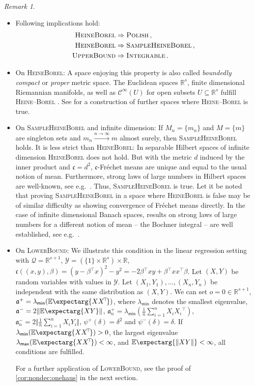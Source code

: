 \documentclass{scrartcl}
\renewcommand{\subset}{\subseteq}
\newcommand{\Ex}{\E\expectarg}
\newcommand*{\mc}[1]{\mathcal{#1}}
\newcommand*{\ms}[1]{\mathsf{#1}}
\newcommand*{\mf}[1]{\mathfrak{#1}}
\newcommand{\R}{\mathbb{R}}
\newcommand{\transpose}{\!^\top\!}
\newcommand{\tr}{\transpose}
\newcommand{\normof}[1]{\Vert #1 \Vert}
\newcommand{\equationFullstop}{\, .}
\newcommand{\eqfs}{\equationFullstop}
\newcommand{\equationComma}{\, ,}
\newcommand{\eqcm}{\equationComma}
\theoremstyle{plain}\newtheorem{theorem}{Theorem}[section]
\theoremstyle{definition}
\theoremstyle{remark}
\newtheorem{remark}[theorem]{Remark}
\begin{document}
\begin{remark}\label{rem:on_ass1}\mbox{ }
\begin{itemize}
\item 
	Following implications hold:
	\begin{align*}
	\textsc{HeineBorel} &\Rightarrow \textsc{Polish}\eqcm\\
	\textsc{HeineBorel} &\Rightarrow \textsc{SampleHeineBorel}\eqcm\\
	\textsc{UpperBound} &\Rightarrow \textsc{Integrable}\eqfs
	\end{align*}
\item On \textsc{HeineBorel}:
	A space enjoying this property is also called \textit{boundedly compact} or \textit{proper} metric space.
	The Euclidean spaces $\R^s$, finite dimensional Riemannian manifolds, as well as $\mc C^\infty(U)$ for open subsets $U \subset \R^s$  fulfill \textsc{Heine--Borel} \cite[section 8.4.7]{edwards95}.
	See \cite{williamson87} for a construction of further spaces where \textsc{Heine--Borel} is true. 
\item On \textsc{SampleHeineBorel} and infinite dimension:
	If $M_n=\{m_n\}$ and $M=\{m\}$ are singleton sets and $m_n \xrightarrow{n\to\infty} m$ almost surely, then \textsc{SampleHeineBorel} holds. It is less strict than \textsc{HeineBorel}: In separable Hilbert spaces of infinite dimension \textsc{HeineBorel} does not hold. But with the metric $d$ induced by the inner product and $\mf c=d^2$, $\mf c$-Fréchet means are unique and equal to the usual notion of mean. Furthermore, strong laws of large numbers in Hilbert spaces are well-known, see e.g.\ \cite{kawabe86}. Thus, \textsc{SampleHeineBorel} is true. Let it be noted that proving \textsc{SampleHeineBorel} in a space where \textsc{HeineBorel} is false may be of similar difficulty as showing convergence of Fréchet means directly. In the case of infinite dimensional Banach spaces, results on strong laws of large numbers for a different notion of mean -- the Bochner integral -- are well established, see e.g.\ \cite{hoffmann76}.
\item On \textsc{LowerBound}:
	We illustrate this condition in the linear regression setting with $\mc Q = \R^{s+1}$, $\mc Y = (\{1\}\times\R^s) \times \R$, $\mf c((x,y),\beta) = (y - \beta\tr x)^2 - y^2 = - 2 \beta\tr x y + \beta\tr xx\tr \beta$. Let $(X, Y)$ be random variables with values in $\mc Y$. Let $(X_1, Y_1),\dots, (X_n, Y_n)$ be independent with the same distribution as $(X,Y)$. We can set $o = 0\in\R^{s+1}$, $\mf a^+ = \lambda_{\ms{min}}(\Ex{XX\tr})$, where $\lambda_{\ms{min}}$ denotes the smallest eigenvalue, $\mf a^- = 2 \normof{\Ex{XY}}$, $\mf a^+_n = \lambda_{\ms{min}}(\frac1n \sum_{i=1}^n X_iX_i\tr)$, $\mf a^-_n = 2 \normof{\frac1n\sum_{i=1}^n X_iY_i}$, $\psi^+(\delta) = \delta^2$ and $\psi^-(\delta) = \delta$. If $\lambda_{\ms{min}}(\Ex{XX\tr}) > 0$, the largest eigenvalue $\lambda_{\ms{max}}(\Ex{XX\tr}) < \infty$, and $\Ex{\normof{XY}} < \infty$, all conditions are fulfilled.
	
	For a further application of \textsc{LowerBound}, see the proof of \autoref{cor:nondec:onehaus} in the next section.
\end{itemize}
\end{remark}
\end{document}
